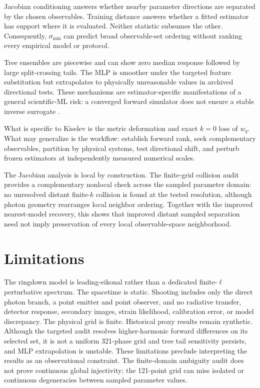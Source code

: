 \documentclass[11pt]{article}
\newcommand{\wq}{w_q}
\newcommand{\smin}{\sigma_{\min}}
\begin{document}
Jacobian conditioning answers whether nearby parameter directions are separated
by the chosen observables. Training distance answers whether a fitted estimator
has support where it is evaluated. Neither statistic subsumes the other.
Consequently, $\smin$ can predict broad observable-set ordering without ranking
every empirical model or protocol.

Tree ensembles are piecewise and can show zero median response followed by
large split-crossing tails. The MLP is smoother under the targeted feature
substitution but extrapolates to physically unreasonable values in archived
directional tests. These mechanisms are estimator-specific manifestations of a
general scientific-ML risk: a converged forward simulator does not ensure a
stable inverse surrogate \cite{ovadia2019uncertainty,koh2021wilds,psaros2023uq}.

What is specific to Kiselev is the metric deformation and exact $k=0$ loss of
$\wq$. What may generalize is the workflow: establish forward rank, seek
complementary observables, partition by physical systems, test directional
shift, and perturb frozen estimators at independently measured numerical scales.

The Jacobian analysis is local by construction. The finite-grid collision
audit provides a complementary nonlocal check across the sampled parameter
domain: no unresolved distant finite-$k$ collision is found at the tested
resolution, although photon geometry rearranges local neighbor ordering.
Together with the improved nearest-model recovery, this shows that improved
distant sampled separation need not imply preservation of every local
observable-space neighborhood.

\section{Limitations}
The ringdown model is leading-eikonal rather than a dedicated finite-$\ell$
perturbative spectrum. The spacetime is static. Shooting includes only the
direct photon branch, a point emitter and point observer, and no radiative
transfer, detector response, secondary images, strain likelihood, calibration
error, or model discrepancy. The physical grid is finite. Historical proxy
results remain synthetic. Although the targeted audit resolves higher-harmonic
forward differences on its selected set, it is not a uniform 321-phase grid and
tree tail sensitivity persists, and MLP extrapolation is unstable. These
limitations preclude interpreting the results as an observational constraint.
The finite-domain ambiguity audit does not prove continuous global injectivity;
the 121-point grid can miss isolated or continuous degeneracies between sampled
parameter values.
\end{document}
